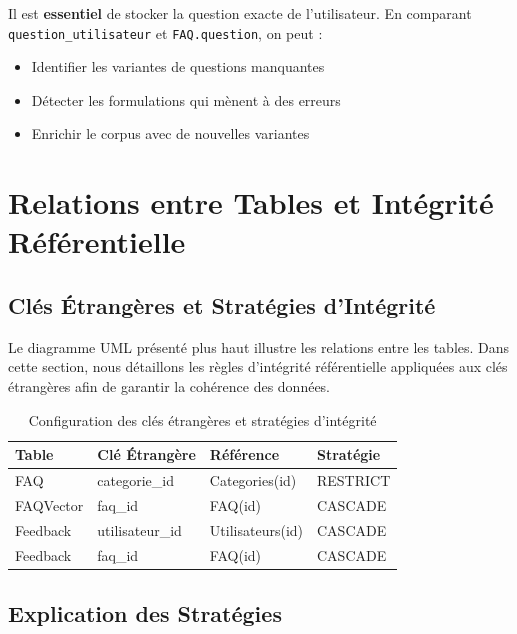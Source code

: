 \documentclass[11pt,a4paper]{article}
\begin{document}
\begin{important}
Il est \textbf{essentiel} de stocker la question exacte de l'utilisateur. En comparant \texttt{question\_utilisateur} et \texttt{FAQ.question}, on peut :
\begin{itemize}
    \item Identifier les variantes de questions manquantes
    \item Détecter les formulations qui mènent à des erreurs
    \item Enrichir le corpus avec de nouvelles variantes
\end{itemize}
\end{important}

\clearpage

\section{Relations entre Tables et Intégrité Référentielle}
\label{sec:relations}

\subsection{Clés Étrangères et Stratégies d’Intégrité}

Le diagramme UML présenté plus haut illustre les relations entre les tables. 
Dans cette section, nous détaillons les règles d’intégrité référentielle appliquées 
aux clés étrangères afin de garantir la cohérence des données.

\begin{table}[H]
\centering
\small
\begin{tabular}{|l|l|l|l|}
\hline
\textbf{Table} & \textbf{Clé Étrangère} & \textbf{Référence} & \textbf{Stratégie} \\
\hline
FAQ & categorie\_id & Categories(id) & RESTRICT \\
\hline
FAQVector & faq\_id & FAQ(id) & CASCADE \\
\hline
Feedback & utilisateur\_id & Utilisateurs(id) & CASCADE \\
\hline
Feedback & faq\_id & FAQ(id) & CASCADE \\
\hline
\end{tabular}
\caption{Configuration des clés étrangères et stratégies d’intégrité}
\end{table}

\subsection{Explication des Stratégies}
\end{document}
